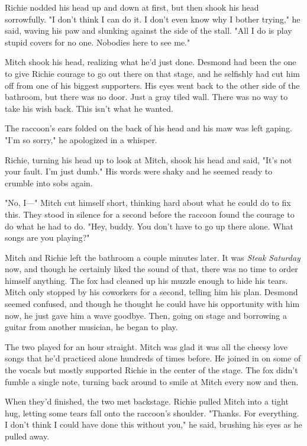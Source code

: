 Richie nodded his head up and down at first, but then shook his head sorrowfully. "I don't think I can do it. I don't even know why I bother trying," he said, waving his paw and slunking against the side of the stall. "All I do is play stupid covers for no one. Nobodies here to see me."

Mitch shook his head, realizing what he'd just done. Desmond had been the one to give Richie courage to go out there on that stage, and he selfishly had cut him off from one of his biggest supporters. His eyes went back to the other side of the bathroom, but there was no door. Just a gray tiled wall. There was no way to take his wish back. This isn't what he wanted.

The raccoon's ears folded on the back of his head and his maw was left gaping. "I'm so sorry," he apologized in a whisper.

Richie, turning his head up to look at Mitch, shook his head and said, "It's not your fault. I'm just dumb." His words were shaky and he seemed ready to crumble into sobs again.

"No, I---" Mitch cut himself short, thinking hard about what he could do to fix this. They stood in silence for a second before the raccoon found the courage to do what he had to do. "Hey, buddy. You don't have to go up there alone. What songs are you playing?"

Mitch and Richie left the bathroom a couple minutes later. It was \emph{Steak Saturday} now, and though he certainly liked the sound of that, there was no time to order himself anything. The fox had cleaned up his muzzle enough to hide his tears. Mitch only stopped by his coworkers for a second, telling him his plan. Desmond seemed confused, and though he thought he could have his opportunity with him now, he just gave him a wave goodbye. Then, going on stage and borrowing a guitar from another musician, he began to play.

The two played for an hour straight. Mitch was glad it was all the cheesy love songs that he'd practiced alone hundreds of times before. He joined in on some of the vocals but mostly supported Richie in the center of the stage. The fox didn't fumble a single note, turning back around to smile at Mitch every now and then.

When they'd finished, the two met backstage. Richie pulled Mitch into a tight hug, letting some tears fall onto the raccoon's shoulder. "Thanks. For everything. I don't think I could have done this without you," he said, brushing his eyes as he pulled away.

